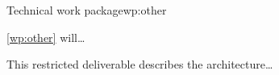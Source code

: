 
\begin{workpackage}{Technical work package}{wp:other}



\makewptable{}


\begin{wpobjectives}
\autoref{wp:other} will\dots
\end{wpobjectives}

\begin{wpdescription}



\end{wpdescription}


\begin{wpdeliverables}




This restricted deliverable describes the architecture\dots


\end{wpdeliverables}

\end{workpackage}
